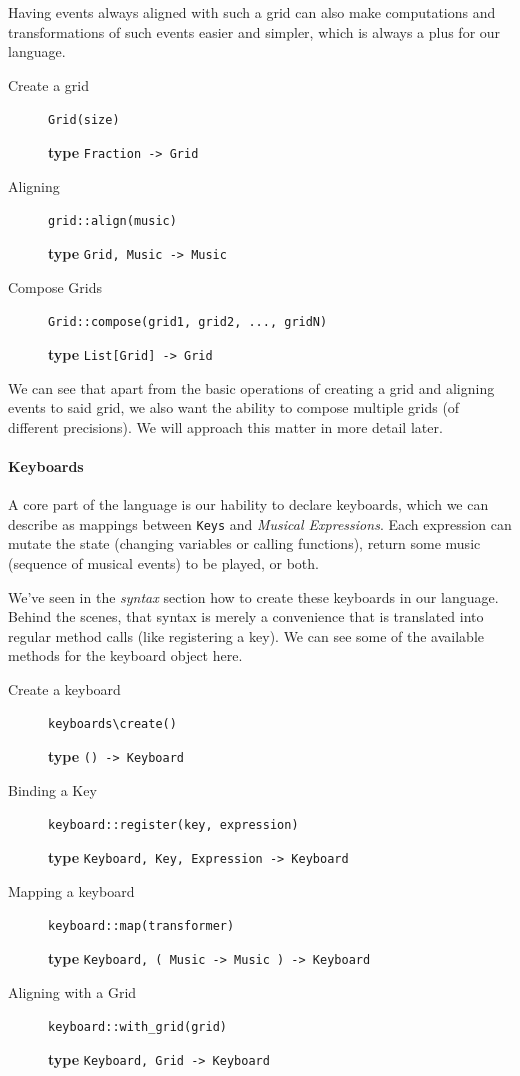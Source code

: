 \documentclass[a4paper,UKenglish,cleveref, autoref]{oasics-v2019}
\begin{document}
Having events always aligned with such a grid can also make computations and transformations of such events easier and simpler, which is always a plus for our language.

\begin{description}
    \item[Create a grid] \verb|Grid(size)|
    
        \textbf{type} \verb|Fraction -> Grid|
    \item[Aligning] \verb'grid::align(music)'
        
        \textbf{type} \verb|Grid, Music -> Music|
    \item[Compose Grids] \verb'Grid::compose(grid1, grid2, ..., gridN)'
        
        \textbf{type} \verb|List[Grid] -> Grid|
\end{description}

We can see that apart from the basic operations of creating a grid and aligning events to said grid, we also want the ability to compose multiple grids (of different precisions). We will approach this matter in more detail later.

\paragraph*{Keyboards}
A core part of the language is our hability to declare keyboards, which we can describe as mappings between \texttt{Keys} and \textit{Musical Expressions}. Each expression can mutate the state (changing variables or calling functions), return some music (sequence of musical events) to be played, or both.

We've seen in the \textit{syntax} section how to create these keyboards in our language. Behind the scenes, that syntax is merely a convenience that is translated into regular method calls (like registering a key). We can see some of the available methods for the keyboard object here.

\begin{description}
    \item[Create a keyboard] \verb|keyboards\create()|
    
        \textbf{type} \verb|() -> Keyboard|
    \item[Binding a Key] \verb'keyboard::register(key, expression)'
        
        \textbf{type} \verb|Keyboard, Key, Expression -> Keyboard|
    \item[Mapping a keyboard] \verb'keyboard::map(transformer)'
        
        \textbf{type} \verb|Keyboard, ( Music -> Music ) -> Keyboard|
    \item[Aligning with a Grid] \verb'keyboard::with_grid(grid)'
        
        \textbf{type} \verb|Keyboard, Grid -> Keyboard|    
\end{description}
\end{document}
